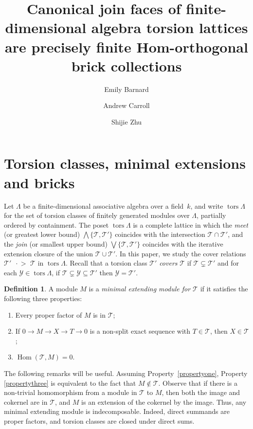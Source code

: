 \documentclass[10pt]{amsart}
\providecommand{\1}{}
\DeclareMathOperator{\tors}{tors}
\DeclareMathOperator{\Hom}{Hom}
\newcommand{\calT}{\mathcal{T}}
\newcommand{\calY}{\mathcal{Y}}
\newcommand{\covers}{{\,\,\,\cdot\!\!\!\! >\,\,}}
\renewcommand{\Join}{\bigvee}
\newcommand{\Meet}{\bigwedge}
\renewcommand{\1}{\hat{1}}
\newcommand{\0}{\hat{0}}
\newcommand{\newword}[1]{\emph{#1}}
\theoremstyle{definition}
\newtheorem{definition}[theorem]{Definition}
\begin{document}
\title{Canonical join faces of finite-dimensional algebra torsion lattices are precisely finite Hom-orthogonal brick collections}
\author{Emily Barnard \and Andrew Carroll \and Shijie Zhu}
\maketitle
\section{Torsion classes, minimal extensions and bricks}
Let $\Lambda$ be a
finite-dimensional associative algebra over a field~$k$, and write
$\tors \Lambda$ for the set of torsion classes of finitely generated
modules over $\Lambda$, partially ordered by containment.
The poset $\tors \Lambda$ is a complete lattice in which the \newword{meet} (or greatest lower bound) $\Meet \{\calT, \calT'\}$ coincides with the intersection $\calT \cap \calT'$, and the \newword{join} (or smallest upper bound) $\Join \{\calT, \calT'\}$ coincides with the iterative extension closure of the union $\calT\cup \calT'$.
In this paper, we study the cover relations $\calT'\covers \calT$ in $\tors \Lambda$.
Recall that a torsion class $\calT'$ \newword{covers} $\calT$ if $\calT\subsetneq \calT'$ and for each $\calY\in \tors\Lambda$, if $\calT\subsetneq \calY \subseteq \calT'$ then $\calY= \calT'$.
\begin{definition}\label{def:min-ext-module}
A module $M$ is a \newword{minimal extending module for $\calT$} if it satisfies the following three properties:
\begin{enumerate}[label={(P\arabic*)}]
 \item Every proper factor of \label{propertyone}
 $M$ is in $\calT$;
 \item If $0\rightarrow M\rightarrow X
 \rightarrow T\rightarrow 0$ is a non-split exact sequence with
 $T\in \calT$, then $X\in \calT$; \label{propertytwo}
 \item $\Hom(\calT, M)=0$. \label{propertythree}
 \end{enumerate}
\end{definition}
The following remarks will be useful. 
Assuming Property~\ref{propertyone}, Property
\ref{propertythree} is equivalent to the fact that $M\notin \calT$. 
Observe that if there is a non-trivial homomorphism from a module in
$\calT$ to $M$, then both the image and cokernel are in $\calT$, and
$M$ is an extension of the cokernel by the image.
Thus, any minimal extending module is indecomposable. 
Indeed, direct summands are proper factors, and torsion classes are closed under direct sums. 
\end{document}
